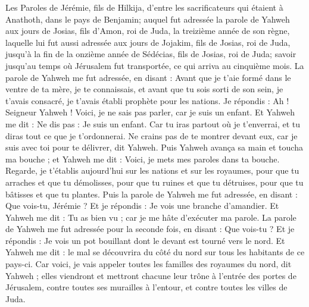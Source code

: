 \begin{multicols}{2}
\VerseOne{}Les Paroles de Jérémie, fils de Hilkija, d'entre les sacrificateurs qui étaient à Anathoth, dans le pays de Benjamin;
auquel fut adressée la parole de Yahweh aux jours de Josias, fils d'Amon, roi de Juda, la treizième année de son règne,
laquelle lui fut aussi adressée aux jours de Jojakim, fils de Josias, roi de Juda, jusqu'à la fin de la onzième année de Sédécias, fils de Josias, roi de Juda; savoir jusqu'au temps où  Jérusalem fut transportée, ce qui arriva au cinquième mois.
La parole de Yahweh me fut adressée, en disant :
Avant que je t'aie formé dans le ventre de ta mère, je te connaissais, et avant que tu sois sorti de son sein, je t'avais consacré, je t'avais établi prophète pour les nations.
Je répondis : Ah ! Seigneur Yahweh ! Voici, je ne sais pas parler, car je suis un enfant.
Et Yahweh me dit : Ne dis pas : Je suis un enfant. Car tu iras partout où je t'enverrai, et tu diras tout ce que je t'ordonnerai.
Ne crains pas de te montrer devant eux, car je suis avec toi pour te délivrer, dit Yahweh.
Puis Yahweh avança sa main et toucha ma bouche ; et Yahweh me dit : Voici, je mets mes paroles dans ta bouche.
Regarde, je t'établis aujourd'hui sur les nations et sur les royaumes, pour que tu arraches et que tu démolisses, pour que tu ruines et que tu détruises, pour que tu bâtisses et que tu plantes.
Puis la parole de Yahweh me fut adressée, en disant : Que vois-tu, Jérémie ? Et je répondis : Je vois une branche d'amandier.
Et Yahweh me dit : Tu as bien vu ; car je me hâte d'exécuter ma parole.
La parole de Yahweh me fut adressée pour la seconde fois, en disant : Que vois-tu ? Et je répondis : Je vois un pot bouillant dont le devant est tourné vers le nord.
Et Yahweh me dit : le mal se découvrira du côté du nord sur tous les habitants de ce pays-ci.
Car voici, je vais appeler toutes les familles des royaumes du nord, dit Yahweh ; elles viendront et mettront chacune leur trône à l'entrée des portes de Jérusalem, contre toutes ses murailles à l'entour, et contre toutes les villes de Juda.

\end{multicols}
